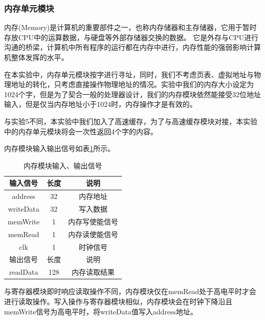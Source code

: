 \documentclass[UTF8]{ctexart}
\begin{document}
\subsubsection{内存单元模块}
    内存(Memory)是计算机的重要部件之一，也称内存储器和主存储器，它用于暂时存放CPU中的运算数据，与硬盘等外部存储器交换的数据。 它是外存与CPU进行沟通的桥梁，计算机中所有程序的运行都在内存中进行，内存性能的强弱影响计算机整体发挥的水平。\par
    在本实验中，内存单元模块按字进行寻址，同时，我们不考虑页表、虚拟地址与物理地址的转化，只考虑直接操作物理地址的情况。实验中我们的内存大小设定为1024个字，但是为了契合一般的处理器设计，我们的内存模块依然能接受32位地址输入，但是仅当内存地址小于1024时，内存操作才是有效的。\par
    与实验5不同，本实验中我们加入了高速缓存，为了与高速缓存模块对接，本实验中的内存单元模块将会一次性返回4个字的内容。\par
    内存模块输入输出信号如表\ref{tab:mem-input-output-sig}所示。
    \begin{table}[htbp]
        \centering
        \begin{tabular}{|c|c|c|}
        \hline
        输入信号 & 长度 & 说明 \\ \hline
        address & 32 & 内存地址 \\
        writeData & 32 & 写入数据 \\
        memWrite & 1 & 内存写使能信号 \\
        memRead & 1 & 内存读使能信号 \\
        clk & 1 & 时钟信号 \\
        \hline
        \hline
        输出信号 & 长度 & 说明 \\ 
        \hline
        readData & 128 & 内存读取结果\\
        \hline
        \end{tabular}
        \caption{内存模块输入、输出信号}
        \label{tab:mem-input-output-sig}
        \end{table}\par
    与寄存器模块即时响应读取操作不同，内存模块仅在memRead处于高电平时才会进行读取操作。写入操作与寄存器模块相似，内存模块会在时钟下降沿且memWrite信号为高电平时，将writeData值写入address地址。
\end{document}
